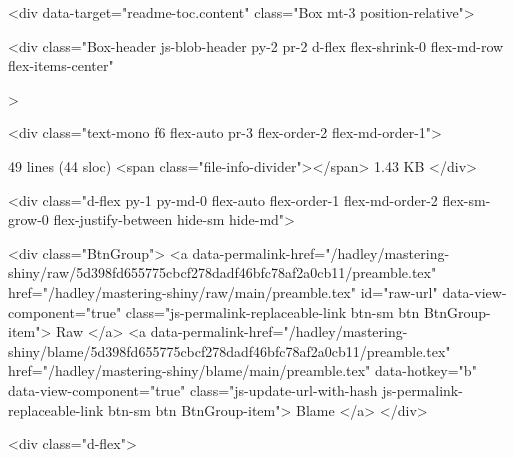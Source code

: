   
    <div data-target="readme-toc.content" class="Box mt-3 position-relative">
      
  <div
    class="Box-header js-blob-header py-2 pr-2 d-flex flex-shrink-0 flex-md-row flex-items-center"
    
  >


  <div class="text-mono f6 flex-auto pr-3 flex-order-2 flex-md-order-1">

      49 lines (44 sloc)
      <span class="file-info-divider"></span>
    1.43 KB
  </div>

  <div class="d-flex py-1 py-md-0 flex-auto flex-order-1 flex-md-order-2 flex-sm-grow-0 flex-justify-between hide-sm hide-md">
      

    <div class="BtnGroup">
        <a data-permalink-href="/hadley/mastering-shiny/raw/5d398fd655775cbcf278dadf46bfc78af2a0cb11/preamble.tex" href="/hadley/mastering-shiny/raw/main/preamble.tex" id="raw-url" data-view-component="true" class="js-permalink-replaceable-link btn-sm btn BtnGroup-item">    Raw
</a>          <a data-permalink-href="/hadley/mastering-shiny/blame/5d398fd655775cbcf278dadf46bfc78af2a0cb11/preamble.tex" href="/hadley/mastering-shiny/blame/main/preamble.tex" data-hotkey="b" data-view-component="true" class="js-update-url-with-hash js-permalink-replaceable-link btn-sm btn BtnGroup-item">    Blame
</a>    </div>

    <div class="d-flex">
        
